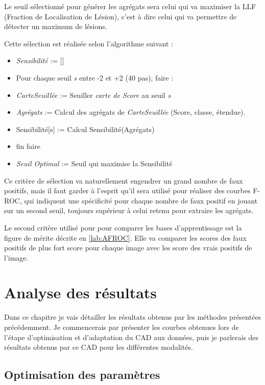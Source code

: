 Le seuil sélectionné pour générer les agrégats sera celui qui va maximiser la LLF (Fraction de Localisation de Lésion), c'est à dire celui qui va permettre de détecter un maximum de lésions. 

Cette sélection est réalisée selon l'algorithme suivant :

\begin{itemize}
 \item \emph{Sensibilité} := []
 \item Pour chaque seuil \emph{s} entre -2 et +2 (40 pas), faire :
 \item \hspace{1cm}\emph{CarteSeuillée} := Seuiller \emph{carte de Score} au seuil \emph{s}
 \item \hspace{1cm}\emph{Agrégats} := Calcul des agrégats de \emph{CarteSeuillée} (Score, classe, étendue).
 \item \hspace{1cm}Sensibilité[s] := Calcul Sensibilité(Agrégats)
 \item fin faire
 \item \emph{Seuil Optimal} := Seuil qui maximise la Sensibilité
\end{itemize}

Ce critère de sélection va naturellement engendrer un grand nombre de faux positifs, mais il faut garder à l'esprit qu'il sera utilisé pour réaliser des courbes F-ROC, qui indiquent une spécificité pour chaque nombre de faux positif en jouant sur un second seuil, toujours supérieur à celui retenu pour extraire les agrégats.

Le second critère utilisé pour pour comparer les bases d'apprentissage est la figure de mérite décrite en \ref{lab:AFROC}. Elle va comparer les scores des faux positifs de plus fort score pour chaque image avec les score  des vrais positifs de l'image.


\chapter{Analyse des résultats}

Dans ce chapitre je vais détailler les résultats obtenus par les méthodes présentées précédemment. Je commencerais par présenter les courbes obtenues lors de l'étape d'optimisation et d'adaptation du CAD aux données, puis je parlerais des résultats obtenus par ce CAD pour les différentes modalités.

\section{Optimisation des paramètres}

